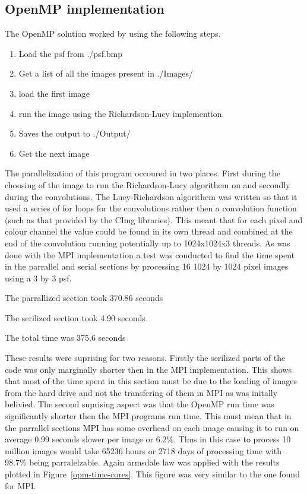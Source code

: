 \subsection{OpenMP implementation}
The OpenMP solution worked by using the following steps.

\begin{enumerate}
	\item Load the psf from ./psf.bmp
	\item Get a list of all the images present in ./Images/
	\item load the first image
	\item run the image using the Richardson-Lucy implemention.
	\item Saves the output to ./Output/
	\item Get the next image
\end{enumerate}

The parallelization of this program occoured in two places. First during the choosing of the image to run the Richardson-Lucy algorithem on and secondly during the convolutions. The Lucy-Richardson algorithem was written so that it used a series of for loops for the convolutions rather then a convolution function (such as that provided by the CImg libraries). This meant that for each pixel and colour channel the value could be found in its own thread and combined at the end of the convolution running potentially up to 1024x1024x3 threads. As was done with the MPI implementation a test was conducted to find the time spent in the parrallel and serial sections by processing 16 1024 by 1024 pixel images  using a 3 by 3 psf.

The parrallized section took 370.86 seconds

The serilized section took 4.90 seconds

The total time was 375.6 seconds

These results were suprising for two reasons. Firstly the serilized parts of the code was only marginally shorter then in the MPI implementation. This shows that most of the time spent in this section must be due to the loading of images from the hard drive and not the transfering of them in MPI as was initally belivied. The second suprising aspect was that the OpenMP run time was significantly shorter then the MPI programs run time. This must mean that in the parrallel sections MPI has some overhead on each image causing it to run on average 0.99 seconds slower per image or 6.2\%. Thus in this case to process 10 million images would take 65236 hours or 2718 days of processing time with 98.7\% being parralelzable. Again armsdale law was applied with the results plotted in Figure~\ref{opm-time-cores}. This figure was very similar to the one found for MPI.

